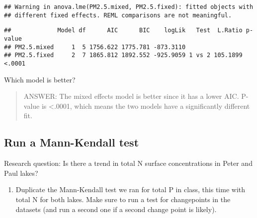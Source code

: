 \documentclass[]{article}
\newenvironment{Shaded}{\begin{snugshade}}{\end{snugshade}}
\newcommand{\KeywordTok}[1]{\textcolor[rgb]{0.13,0.29,0.53}{\textbf{#1}}}
\newcommand{\DecValTok}[1]{\textcolor[rgb]{0.00,0.00,0.81}{#1}}
\newcommand{\StringTok}[1]{\textcolor[rgb]{0.31,0.60,0.02}{#1}}
\newcommand{\CommentTok}[1]{\textcolor[rgb]{0.56,0.35,0.01}{\textit{#1}}}
\newcommand{\OperatorTok}[1]{\textcolor[rgb]{0.81,0.36,0.00}{\textbf{#1}}}
\newcommand{\NormalTok}[1]{#1}
\providecommand{\tightlist}{%
  \setlength{\itemsep}{0pt}\setlength{\parskip}{0pt}}
\begin{document}
\begin{verbatim}
## Warning in anova.lme(PM2.5.mixed, PM2.5.fixed): fitted objects with
## different fixed effects. REML comparisons are not meaningful.
\end{verbatim}

\begin{verbatim}
##             Model df      AIC      BIC    logLik   Test  L.Ratio p-value
## PM2.5.mixed     1  5 1756.622 1775.781 -873.3110                        
## PM2.5.fixed     2  7 1865.812 1892.552 -925.9059 1 vs 2 105.1899  <.0001
\end{verbatim}

Which model is better?

\begin{quote}
ANSWER: The mixed effects model is better since it has a lower AIC.
P-value is \textless{}.0001, which means the two models have a
significantly different fit.
\end{quote}

\subsection{Run a Mann-Kendall test}\label{run-a-mann-kendall-test}

Research question: Is there a trend in total N surface concentrations in
Peter and Paul lakes?

\begin{enumerate}
\def\labelenumi{\arabic{enumi}.}
\setcounter{enumi}{3}
\tightlist
\item
  Duplicate the Mann-Kendall test we ran for total P in class, this time
  with total N for both lakes. Make sure to run a test for changepoints
  in the datasets (and run a second one if a second change point is
  likely).
\end{enumerate}

\begin{Shaded}
\end{Shaded}
\end{document}
